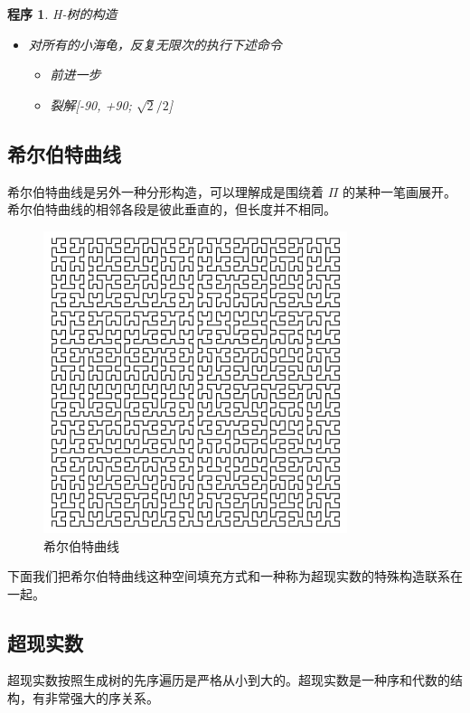 \documentclass[a4paper,12pt]{article}
\newtheorem{program}{程序}
\begin{document}
\begin{program}
H-树的构造
\begin{itemize}
\item 对所有的小海龟，反复无限次的执行下述命令
\begin{itemize}\item 前进一步 \item 裂解[-90, +90; $\sqrt{2} / 2$] \end{itemize}
\end{itemize}
\end{program}

\newpage

\subsection{希尔伯特曲线}

希尔伯特曲线是另外一种分形构造，可以理解成是围绕着 $\Pi$ 的某种一笔画展开。希尔伯特曲线的相邻各段是彼此垂直的，但长度并不相同。

\begin{figure}[ht]
\centering
\includegraphics[width=3.5in]{images/hilbert.png}
\caption{希尔伯特曲线}
\end{figure}

下面我们把希尔伯特曲线这种空间填充方式和一种称为超现实数的特殊构造联系在一起。

\newpage

\subsection{超现实数}

超现实数按照生成树的先序遍历是严格从小到大的。超现实数是一种序和代数的结构，有非常强大的序关系。
\end{document}

